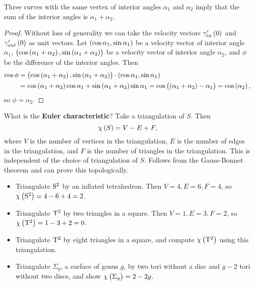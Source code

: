 
\begin{lemma}
Three curves with the same vertex of interior angles $ \alpha_1 $ and $ \alpha_2 $ imply that the sum of the interior angles is $ \alpha_1 + \alpha_2 $.
\end{lemma}

\begin{proof}
Without loss of generality we can take the velocity vectors $ \gamma_{in}'\br{0} $ and $ \gamma_{out}'\br{0} $ as unit vectors. Let $ \br{\cos \alpha_1, \sin \alpha_1} $ be a velocity vector of interior angle $ \alpha_1 $, $ \br{\cos \br{\alpha_1 + \alpha_2}, \sin \br{\alpha_1 + \alpha_2}} $ be a velocity vector of interior angle $ \alpha_2 $, and $ \phi $ be the difference of the interior angles. Then
\begin{align*}
\cos \phi
& = \br{\cos \br{\alpha_1 + \alpha_2}, \sin \br{\alpha_1 + \alpha_2}} \cdot \br{\cos \alpha_1, \sin \alpha_1} \\
& = \cos \br{\alpha_1 + \alpha_2}\cos \alpha_1 + \sin \br{\alpha_1 + \alpha_2}\sin \alpha_1
= \cos \br{\br{\alpha_1 + \alpha_2} - \alpha_1}
= \cos \br{\alpha_2},
\end{align*}
so $ \phi = \alpha_2 $.
\end{proof}

What is the \textbf{Euler characteristic}? Take a triangulation of $ S $. Then
$$ \chi\br{S} = V - E + F, $$
where $ V $ is the number of vertices in the triangulation, $ E $ is the number of edges in the triangulation, and $ F $ is the number of triangles in the triangulation. This is independent of the choice of triangulation of $ S $. Follows from the Gauss-Bonnet theorem and can prove this topologically.

\begin{example*}
\hfill
\begin{itemize}
\item Triangulate $ \S^2 $ by an inflated tetrahedron. Then $ V = 4, E = 6, F = 4 $, so $ \chi\br{\S^2} = 4 - 6 + 4 = 2 $.
\item Triangulate $ \T^2 $ by two triangles in a square. Then $ V = 1, E = 3, F = 2 $, so $ \chi\br{\T^2} = 1 - 3 + 2 = 0 $.
\end{itemize}
\end{example*}

\begin{exercise*}
\hfill
\begin{itemize}
\item Triangulate $ \T^2 $ by eight triangles in a square, and compute $ \chi\br{\T^2} $ using this triangulation.
\item Triangulate $ \Sigma_g $, a surface of genus $ g $, by two tori without a disc and $ g - 2 $ tori without two discs, and show $ \chi\br{\Sigma_g} = 2 - 2g $.
\end{itemize}
\end{exercise*}

